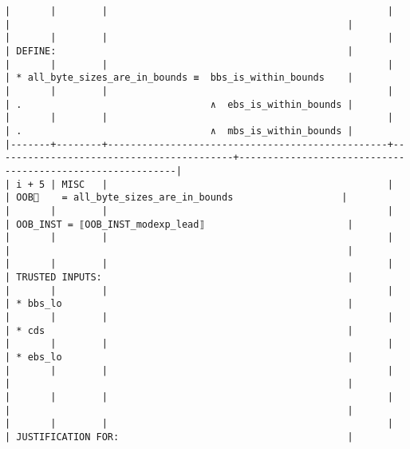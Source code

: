 \documentclass[varwidth=\maxdimen,margin=0.5cm,multi={verbatim}]{standalone}
\begin{document}
\begin{verbatim}
|       |        |                                                 |                                          |                                                           |
|       |        |                                                 |                                          | DEFINE:                                                   |
|       |        |                                                 |                                          | * all_byte_sizes_are_in_bounds ≡  bbs_is_within_bounds    |
|       |        |                                                 |                                          | .                                 ∧  ebs_is_within_bounds |
|       |        |                                                 |                                          | .                                 ∧  mbs_is_within_bounds |
|-------+--------+-------------------------------------------------+------------------------------------------+-----------------------------------------------------------|
| i + 5 | MISC   |                                                 |                                          | OOB🏴    = all_byte_sizes_are_in_bounds                   |
|       |        |                                                 |                                          | OOB_INST = ⟦OOB_INST_modexp_lead⟧                         |
|       |        |                                                 |                                          |                                                           |
|       |        |                                                 |                                          | TRUSTED INPUTS:                                           |
|       |        |                                                 |                                          | * bbs_lo                                                  |
|       |        |                                                 |                                          | * cds                                                     |
|       |        |                                                 |                                          | * ebs_lo                                                  |
|       |        |                                                 |                                          |                                                           |
|       |        |                                                 |                                          |                                                           |
|       |        |                                                 |                                          | JUSTIFICATION FOR:                                        |

\end{verbatim}
\end{document}
